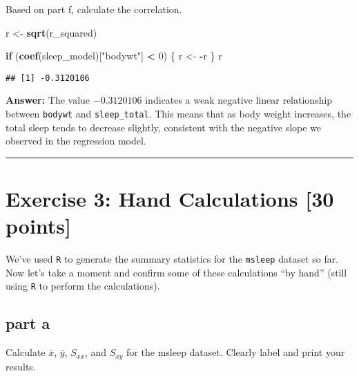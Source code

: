 \documentclass[
]{article}
\newenvironment{Shaded}{\begin{snugshade}}{\end{snugshade}}
\newcommand{\ControlFlowTok}[1]{\textcolor[rgb]{0.13,0.29,0.53}{\textbf{#1}}}
\newcommand{\DecValTok}[1]{\textcolor[rgb]{0.00,0.00,0.81}{#1}}
\newcommand{\FunctionTok}[1]{\textcolor[rgb]{0.13,0.29,0.53}{\textbf{#1}}}
\newcommand{\NormalTok}[1]{#1}
\newcommand{\OtherTok}[1]{\textcolor[rgb]{0.56,0.35,0.01}{#1}}
\newcommand{\SpecialCharTok}[1]{\textcolor[rgb]{0.81,0.36,0.00}{\textbf{#1}}}
\newcommand{\StringTok}[1]{\textcolor[rgb]{0.31,0.60,0.02}{#1}}
\begin{document}
Based on part f, calculate the correlation.

\begin{Shaded}
\begin{Highlighting}[]
\NormalTok{r }\OtherTok{\textless{}{-}} \FunctionTok{sqrt}\NormalTok{(r\_squared)}

\ControlFlowTok{if}\NormalTok{ (}\FunctionTok{coef}\NormalTok{(sleep\_model)[}\StringTok{"bodywt"}\NormalTok{] }\SpecialCharTok{\textless{}} \DecValTok{0}\NormalTok{) \{}
\NormalTok{  r }\OtherTok{\textless{}{-}} \SpecialCharTok{{-}}\NormalTok{r}
\NormalTok{\}}
\NormalTok{r}
\end{Highlighting}
\end{Shaded}

\begin{verbatim}
## [1] -0.3120106
\end{verbatim}

\textbf{Answer:} The value \(-0.3120106\) indicates a weak negative
linear relationship between \texttt{bodywt} and \texttt{sleep\_total}.
This means that as body weight increases, the total sleep tends to
decrease slightly, consistent with the negative slope we observed in the
regression model.

\begin{center}\rule{0.5\linewidth}{0.5pt}\end{center}

\section{Exercise 3: Hand Calculations {[}30
points{]}}\label{exercise-3-hand-calculations-30-points}

We've used \texttt{R} to generate the summary statistics for the
\texttt{msleep} dataset so far. Now let's take a moment and confirm some
of these calculations ``by hand'' (still using \texttt{R} to perform the
calculations).

\subsection{part a}\label{part-a-1}

Calculate \(\bar{x}\), \(\bar{y}\), \(S_{xx}\), and \(S_{xy}\) for the
msleep dataset. Clearly label and print your results.
\end{document}
